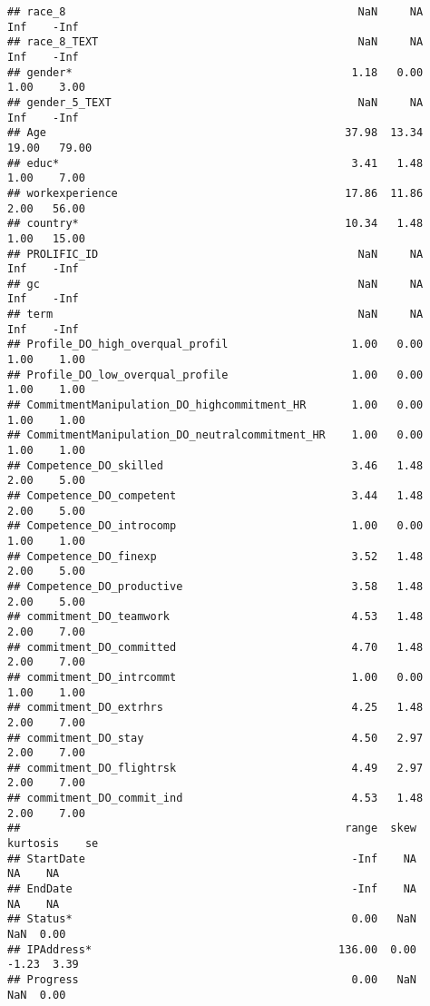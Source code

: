 \documentclass[]{article}
\begin{document}
\begin{verbatim}
## race_8                                             NaN     NA     Inf    -Inf
## race_8_TEXT                                        NaN     NA     Inf    -Inf
## gender*                                           1.18   0.00    1.00    3.00
## gender_5_TEXT                                      NaN     NA     Inf    -Inf
## Age                                              37.98  13.34   19.00   79.00
## educ*                                             3.41   1.48    1.00    7.00
## workexperience                                   17.86  11.86    2.00   56.00
## country*                                         10.34   1.48    1.00   15.00
## PROLIFIC_ID                                        NaN     NA     Inf    -Inf
## gc                                                 NaN     NA     Inf    -Inf
## term                                               NaN     NA     Inf    -Inf
## Profile_DO_high_overqual_profil                   1.00   0.00    1.00    1.00
## Profile_DO_low_overqual_profile                   1.00   0.00    1.00    1.00
## CommitmentManipulation_DO_highcommitment_HR       1.00   0.00    1.00    1.00
## CommitmentManipulation_DO_neutralcommitment_HR    1.00   0.00    1.00    1.00
## Competence_DO_skilled                             3.46   1.48    2.00    5.00
## Competence_DO_competent                           3.44   1.48    2.00    5.00
## Competence_DO_introcomp                           1.00   0.00    1.00    1.00
## Competence_DO_finexp                              3.52   1.48    2.00    5.00
## Competence_DO_productive                          3.58   1.48    2.00    5.00
## commitment_DO_teamwork                            4.53   1.48    2.00    7.00
## commitment_DO_committed                           4.70   1.48    2.00    7.00
## commitment_DO_intrcommt                           1.00   0.00    1.00    1.00
## commitment_DO_extrhrs                             4.25   1.48    2.00    7.00
## commitment_DO_stay                                4.50   2.97    2.00    7.00
## commitment_DO_flightrsk                           4.49   2.97    2.00    7.00
## commitment_DO_commit_ind                          4.53   1.48    2.00    7.00
##                                                  range  skew kurtosis    se
## StartDate                                         -Inf    NA       NA    NA
## EndDate                                           -Inf    NA       NA    NA
## Status*                                           0.00   NaN      NaN  0.00
## IPAddress*                                      136.00  0.00    -1.23  3.39
## Progress                                          0.00   NaN      NaN  0.00

\end{verbatim}
\end{document}
